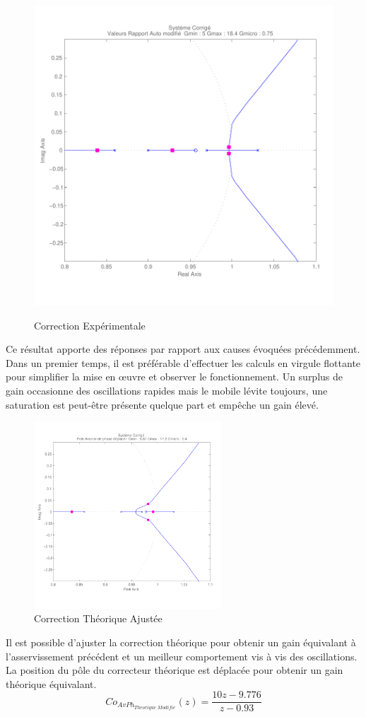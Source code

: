 \documentclass[11pt, french]{article} %
\begin{document}
\begin{figure}[h!]
	\centering
	\includegraphics[width = 13cm,trim=0 1.4cm 0 0.7cm ,clip=true]
					{SolutionNumerique/SystemeCorrigeSolex.pdf}
	\label{CorrExpe}	
	\caption{Correction Expérimentale}
\end{figure}

Ce résultat apporte des réponses par rapport aux causes évoquées précédemment. Dans un premier temps, il est préférable d'effectuer les calculs en virgule flottante pour simplifier la mise en œuvre et observer le fonctionnement. Un surplus de gain occasionne des oscillations rapides mais le mobile lévite toujours, une saturation est peut-être présente quelque part et empêche un gain élevé.

\begin{figure}
	\vspace{-0.5cm}
	\includegraphics[width = 7cm,trim=0 1.4cm 0 0.7cm ,clip=true]
					{SolutionNumerique/SystemeCorrigeThoriqueAdapte.pdf}
	\caption{Correction Théorique Ajustée}
\end{figure}
Il est possible d'ajuster la correction théorique pour obtenir un gain équivalant à l'asservissement précédent et un meilleur comportement vis à vis des oscillations. La position du pôle du correcteur théorique est déplacée pour obtenir un gain théorique équivalant. 
\[  Co_{AvPh_{Theorique \; Modifie}}(z) = \dfrac {10z - 9.776} {z - 0.93} \]
\end{document}
